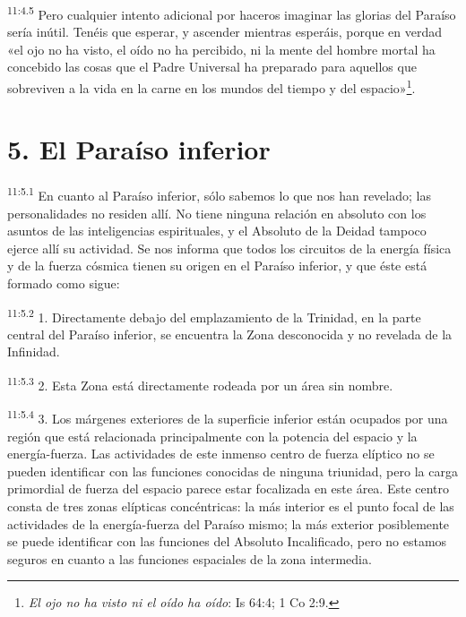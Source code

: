 \par
\textsuperscript{11:4.5} Pero cualquier intento adicional por haceros imaginar las glorias del Paraíso sería inútil. Tenéis que esperar, y ascender mientras esperáis, porque en verdad «el ojo no ha visto, el oído no ha percibido, ni la mente del hombre mortal ha concebido las cosas que el Padre Universal ha preparado para aquellos que sobreviven a la vida en la carne en los mundos del tiempo y del espacio»\footnote{\textit{El ojo no ha visto ni el oído ha oído}: Is 64:4; 1 Co 2:9.}.

\section*{5. El Paraíso inferior}
\par
\textsuperscript{11:5.1} En cuanto al Paraíso inferior, sólo sabemos lo que nos han revelado; las personalidades no residen allí. No tiene ninguna relación en absoluto con los asuntos de las inteligencias espirituales, y el Absoluto de la Deidad tampoco ejerce allí su actividad. Se nos informa que todos los circuitos de la energía física y de la fuerza cósmica tienen su origen en el Paraíso inferior, y que éste está formado como sigue:

\par
\textsuperscript{11:5.2} 1. Directamente debajo del emplazamiento de la Trinidad, en la parte central del Paraíso inferior, se encuentra la Zona desconocida y no revelada de la Infinidad.

\par
\textsuperscript{11:5.3} 2. Esta Zona está directamente rodeada por un área sin nombre.

\par
\textsuperscript{11:5.4} 3. Los márgenes exteriores de la superficie inferior están ocupados por una región que está relacionada principalmente con la potencia del espacio y la energía-fuerza. Las actividades de este inmenso centro de fuerza elíptico no se pueden identificar con las funciones conocidas de ninguna triunidad, pero la carga primordial de fuerza del espacio parece estar focalizada en este área. Este centro consta de tres zonas elípticas concéntricas: la más interior es el punto focal de las actividades de la energía-fuerza del Paraíso mismo; la más exterior posiblemente se puede identificar con las funciones del Absoluto Incalificado, pero no estamos seguros en cuanto a las funciones espaciales de la zona intermedia.

